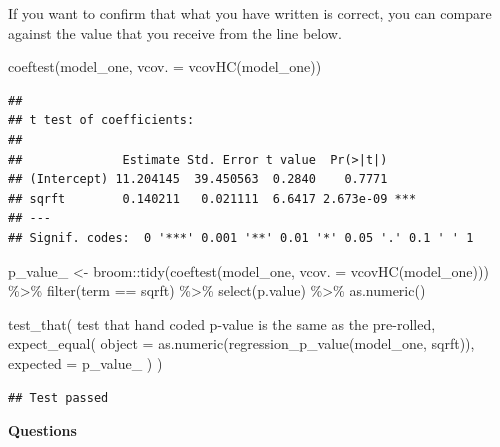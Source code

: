 \documentclass[
]{book}
\newenvironment{Shaded}{\begin{snugshade}}{\end{snugshade}}
\newcommand{\AttributeTok}[1]{\textcolor[rgb]{0.77,0.63,0.00}{#1}}
\newcommand{\FunctionTok}[1]{\textcolor[rgb]{0.00,0.00,0.00}{#1}}
\newcommand{\NormalTok}[1]{#1}
\newcommand{\OtherTok}[1]{\textcolor[rgb]{0.56,0.35,0.01}{#1}}
\newcommand{\SpecialCharTok}[1]{\textcolor[rgb]{0.00,0.00,0.00}{#1}}
\newcommand{\StringTok}[1]{\textcolor[rgb]{0.31,0.60,0.02}{#1}}
\theoremstyle{definition}
\theoremstyle{definition}
\theoremstyle{definition}
\theoremstyle{definition}
\theoremstyle{remark}
\begin{document}
If you want to confirm that what you have written is correct, you can compare against
the value that you receive from the line below.

\begin{Shaded}
\begin{Highlighting}[]
\FunctionTok{coeftest}\NormalTok{(model\_one, }\AttributeTok{vcov. =} \FunctionTok{vcovHC}\NormalTok{(model\_one))}
\end{Highlighting}
\end{Shaded}

\begin{verbatim}
## 
## t test of coefficients:
## 
##              Estimate Std. Error t value  Pr(>|t|)    
## (Intercept) 11.204145  39.450563  0.2840    0.7771    
## sqrft        0.140211   0.021111  6.6417 2.673e-09 ***
## ---
## Signif. codes:  0 '***' 0.001 '**' 0.01 '*' 0.05 '.' 0.1 ' ' 1
\end{verbatim}

\begin{Shaded}
\begin{Highlighting}[]
\NormalTok{p\_value\_ }\OtherTok{\textless{}{-}}\NormalTok{ broom}\SpecialCharTok{::}\FunctionTok{tidy}\NormalTok{(}\FunctionTok{coeftest}\NormalTok{(model\_one, }\AttributeTok{vcov. =} \FunctionTok{vcovHC}\NormalTok{(model\_one))) }\SpecialCharTok{\%\textgreater{}\%} 
  \FunctionTok{filter}\NormalTok{(term }\SpecialCharTok{==} \StringTok{\textquotesingle{}sqrft\textquotesingle{}}\NormalTok{) }\SpecialCharTok{\%\textgreater{}\%} 
  \FunctionTok{select}\NormalTok{(}\StringTok{\textquotesingle{}p.value\textquotesingle{}}\NormalTok{) }\SpecialCharTok{\%\textgreater{}\%} 
  \FunctionTok{as.numeric}\NormalTok{()}

\FunctionTok{test\_that}\NormalTok{(}
  \StringTok{\textquotesingle{}test that hand coded p{-}value is the same as the pre{-}rolled\textquotesingle{}}\NormalTok{, }
  \FunctionTok{expect\_equal}\NormalTok{(}
    \AttributeTok{object   =} \FunctionTok{as.numeric}\NormalTok{(}\FunctionTok{regression\_p\_value}\NormalTok{(model\_one, }\StringTok{\textquotesingle{}sqrft\textquotesingle{}}\NormalTok{)), }
    \AttributeTok{expected =}\NormalTok{ p\_value\_}
\NormalTok{  )}
\NormalTok{)}
\end{Highlighting}
\end{Shaded}

\begin{verbatim}
## Test passed
\end{verbatim}

\textbf{Questions}
\end{document}
